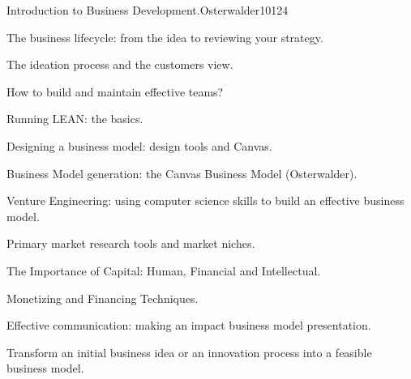 \begin{syllabus}
\begin{unit}{Introduction to Business Development.}{}{Osterwalder10}{12}{4}
   \begin{topics}
      \item The business lifecycle: from the idea to reviewing your strategy.
      \item The ideation process and the customers view.
      \item How to build and maintain effective teams?
      \item Running LEAN: the basics.
      \item Designing a business model: design tools and Canvas.
      \item Business Model generation: the Canvas Business Model (Osterwalder).
      \item Venture Engineering: using computer science skills to build an effective business model.
      \item Primary market research tools and market niches.
      \item The Importance of Capital: Human, Financial and Intellectual.
      \item Monetizing and Financing Techniques.
      \item Effective communication: making an impact business model presentation.
   \end{topics}
   \begin{learningoutcomes}
      \item Transform an initial business idea or an innovation process into a feasible business model.
   \end{learningoutcomes}
\end{unit}

\begin{coursebibliography}
\end{coursebibliography}

\end{syllabus}
